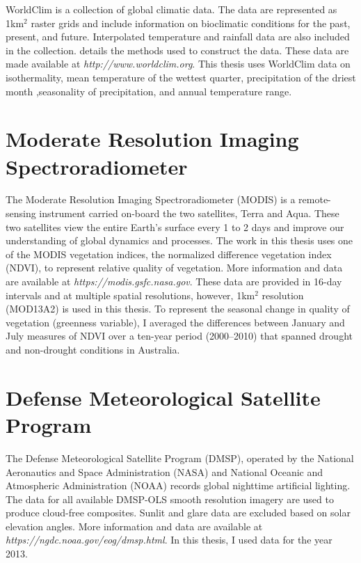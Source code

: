 WorldClim is a collection of global climatic data. The data are represented as 1km$^2$ raster grids and include information on bioclimatic conditions for the past, present, and future. Interpolated temperature and rainfall data are also included in the collection. \cite{hijm05} details the methods used to construct the data. These data are made available at \textit{http://www.worldclim.org}. This thesis uses WorldClim data on isothermality, mean temperature of the wettest quarter, precipitation of the driest month ,seasonality of precipitation, and annual temperature range.

\section{Moderate Resolution Imaging Spectroradiometer}

The Moderate Resolution Imaging Spectroradiometer (MODIS) is a remote-sensing instrument carried on-board the two satellites, Terra and Aqua. These two satellites view the entire Earth's surface every 1 to 2 days and improve our understanding of global dynamics and processes. The work in this thesis uses one of the MODIS vegetation indices, the normalized difference vegetation index (NDVI), to represent relative quality of vegetation. More information and data are available at \textit{https://modis.gsfc.nasa.gov}. These data are provided in 16-day intervals and at multiple spatial resolutions, however, 1km$^2$ resolution (MOD13A2) is used in this thesis. To represent the seasonal change in quality of vegetation (greenness variable), I averaged the differences between January and July measures of NDVI over a ten-year period (2000--2010) that spanned drought and non-drought conditions in Australia.

\section{Defense Meteorological Satellite Program}

The Defense Meteorological Satellite Program (DMSP), operated by the National Aeronautics and Space Administration (NASA) and National Oceanic and Atmospheric Administration (NOAA) records global nighttime artificial lighting. The data for all available DMSP-OLS smooth resolution imagery are used to produce cloud-free composites. Sunlit and glare data are excluded based on solar elevation angles. More information and data are available at \textit{https://ngdc.noaa.gov/eog/dmsp.html}. In this thesis, I used data for the year 2013.


